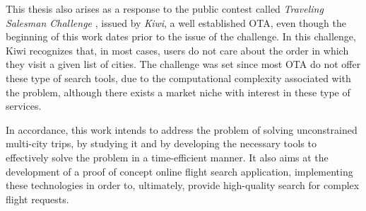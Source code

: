 This thesis also arises as a response to the public contest called \textit{Traveling Salesman Challenge} \cite{tsc_kiwi}, issued by \textit{Kiwi}, a well established OTA, even though the beginning of this work dates prior to the issue of the challenge. In this challenge, Kiwi recognizes that, in most cases, users do not care about the order in which they visit a given list of cities.
The challenge was set since most OTA do not offer these type of search tools, due to the computational complexity associated with the problem, although there exists a market niche with interest in these type of services.

In accordance, this work intends to address the problem of solving unconstrained multi-city trips, by studying it and by developing the necessary tools to effectively solve the problem in a time-efficient manner. It also aims at the development of a proof of concept online flight search application, 
implementing these technologies in order to, ultimately, provide high-quality search
for complex flight requests.

